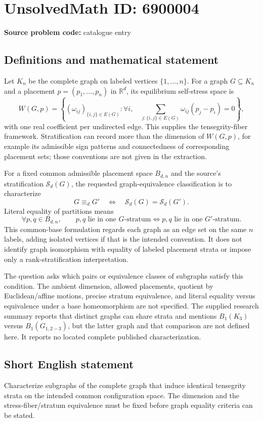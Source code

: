 \documentclass[11pt]{article}
\newcommand{\R}{\mathbb{R}}
\begin{document}
\section*{UnsolvedMath ID: 6900004}
\textbf{Source problem code:} catalogue entry
\subsection{Definitions and mathematical statement}
Let \(K_n\) be the complete graph on labeled vertices \(\{1,\ldots,n\}\). For a graph \(G\subseteq K_n\) and a placement \(p=(p_1,\ldots,p_n)\) in \(\R^d\), its equilibrium self-stress space is
\[
W(G,p)=\left\{(\omega_{ij})_{\{i,j\}\in E(G)}:
\forall i,\quad\sum_{j:\{i,j\}\in E(G)}\omega_{ij}(p_j-p_i)=0\right\},
\]
with one real coefficient per undirected edge. This supplies the tensegrity-fiber framework. Stratification can record more than the dimension of \(W(G,p)\), for example its admissible sign patterns and connectedness of corresponding placement sets; those conventions are not given in the extraction.

For a fixed common admissible placement space \(B_{d,n}\) and the source's stratification \(\mathscr S_d(G)\), the requested graph-equivalence classification is to characterize
\[
G\equiv_d G'\quad\Longleftrightarrow\quad
\mathscr S_d(G)=\mathscr S_d(G').
\]
Literal equality of partitions means
\[
\forall p,q\in B_{d,n},\qquad
p,q\text{ lie in one }G\text{-stratum}
\iff p,q\text{ lie in one }G'\text{-stratum}.
\]
This common-base formulation regards each graph as an edge set on the same \(n\) labels, adding isolated vertices if that is the intended convention. It does not identify graph isomorphism with equality of labeled placement strata or impose only a rank-stratification interpretation.

The question asks which pairs or equivalence classes of subgraphs satisfy this condition. The ambient dimension, allowed placements, quotient by Euclidean/affine motions, precise stratum equivalence, and literal equality versus equivalence under a base homeomorphism are not specified. The supplied research summary reports that distinct graphs can share strata and mentions \(B_1(K_3)\) versus \(B_1(G_{1,2-3})\), but the latter graph and that comparison are not defined here. It reports no located complete published characterization.
\subsection{Short English statement}
Characterize subgraphs of the complete graph that induce identical tensegrity strata on the intended common configuration space. The dimension and the stress-fiber/stratum equivalence must be fixed before graph equality criteria can be stated.
\end{document}

